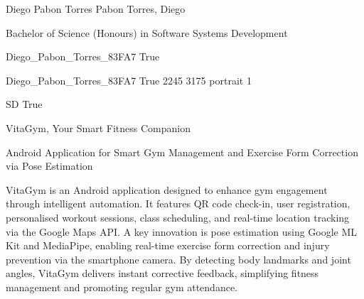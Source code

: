 \documentclass[twoside]{report}
\begin{document}
\begingroup{}\relax



\def\Key{Diego_Pabon_Torres_83FA7}

{Diego Pabon Torres}
{Pabon Torres, Diego}

{Bachelor of Science (Honours) in Software Systems Development}

{Diego_Pabon_Torres_83FA7}
{True}

{Diego_Pabon_Torres_83FA7}
{True}
{2245}
{3175}
{portrait}
{1}

{SD}
{True}

{VitaGym, Your Smart Fitness Companion}

{Android Application for Smart Gym Management and Exercise Form Correction via Pose Estimation}

{VitaGym is an Android application designed to enhance gym engagement through intelligent automation. It features QR code check-in, user registration, personalised workout sessions, class scheduling, and real-time location tracking via the Google Maps API. A key innovation is pose estimation using Google ML Kit and MediaPipe, enabling real-time exercise form correction and injury prevention via the smartphone camera. By detecting body landmarks and joint angles, VitaGym delivers instant corrective feedback, simplifying fitness management and promoting regular gym attendance.}
\end{document}

